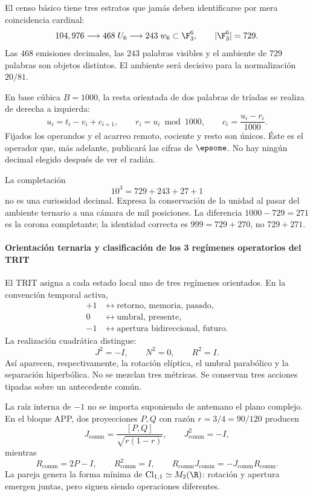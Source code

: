 El censo básico tiene tres estratos que jamás deben identificarse por mera
coincidencia cardinal:
\[
104,976\longrightarrow468\;U_6\longrightarrow243\;w_6
\subset\F_3^6,\qquad |\F_3^6|=729.
\]
Las \(468\) emisiones decimales, las \(243\) palabras visibles y el ambiente
de \(729\) palabras son objetos distintos. El ambiente será decisivo para la
normalización \(20/81\).

En base cúbica \(B=1000\), la resta orientada de dos palabras de tríadas se
realiza de derecha a izquierda:
\begin{equation}
u_i=t_i-v_i+c_{i+1},\qquad
r_i=u_i\bmod1000,\qquad
c_i=\frac{u_i-r_i}{1000}.
\label{eq:subacarreo}
\end{equation}
Fijados los operandos y el acarreo remoto, cociente y resto son únicos. Éste es
el operador que, más adelante, publicará las cifras de \(\epsone\). No hay
ningún decimal elegido después de ver el radián.

La completación
\[
10^3=729+243+27+1
\]
no es una curiosidad decimal. Expresa la conservación de la unidad al pasar
del ambiente ternario a una cámara de mil posiciones. La diferencia
\(1000-729=271\) es la corona completante; la identidad correcta es
\(999=729+270\), no \(729+271\).

\paragraph{Orientación ternaria y clasificación de los 3 regímenes operatorios del TRIT}

El TRIT asigna a cada estado local uno de tres regímenes orientados. En la
convención temporal activa,
\[
\begin{aligned}
+1&\longleftrightarrow\text{retorno, memoria, pasado},\\
0&\longleftrightarrow\text{umbral, presente},\\
-1&\longleftrightarrow\text{apertura bidireccional, futuro}.
\end{aligned}
\]
La realización cuadrática distingue:
\begin{equation}
J^2=-I,\qquad N^2=0,\qquad R^2=I.
\label{eq:tres-regimenes}
\end{equation}
Así aparecen, respectivamente, la rotación elíptica, el umbral parabólico y
la separación hiperbólica. No se mezclan tres métricas. Se conservan tres
acciones tipadas sobre un antecedente común.

La raíz interna de \(-1\) no se importa suponiendo de antemano el plano
complejo. En el bloque APP, dos proyecciones \(P,Q\) con razón
\(r=3/4=90/120\) producen
\[
J_{\mathrm{comm}}=\frac{[P,Q]}{\sqrt{r(1-r)}},\qquad J_{\mathrm{comm}}^2=-I,
\]
mientras
\[
R_{\mathrm{comm}}=2P-I,\qquad R_{\mathrm{comm}}^2=I,\qquad
R_{\mathrm{comm}}J_{\mathrm{comm}}=-J_{\mathrm{comm}}R_{\mathrm{comm}}.
\]
La pareja genera la forma mínima de \(\mathrm{Cl}_{1,1}\simeq M_2(\R)\):
rotación y apertura emergen juntas, pero siguen siendo operaciones diferentes.

